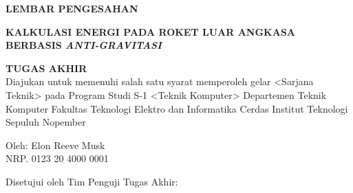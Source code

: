 \begin{center}
	\large
  \textbf{LEMBAR PENGESAHAN}
\end{center}

\thispagestyle{empty}

\begin{center}
  \textbf{KALKULASI ENERGI PADA ROKET LUAR ANGKASA BERBASIS \emph{ANTI-GRAVITASI}}
\end{center}

\begingroup
  \small


  \begin{center}
    \textbf{TUGAS AKHIR}
    \\Diajukan untuk memenuhi salah satu syarat memperoleh gelar <Sarjana Teknik> pada Program Studi S-1 <Teknik Komputer> Departemen Teknik Komputer Fakultas Teknologi Elektro dan Informatika Cerdas Institut Teknologi Sepuluh Nopember
  \end{center}


  \begin{center}
    Oleh: Elon Reeve Musk 
    \\NRP. 0123 20 4000 0001
  \end{center}



  \begin{center}
    Disetujui oleh Tim Penguji Tugas Akhir:
  \end{center}


  \begingroup
    \setlength{\tabcolsep}{0pt}

